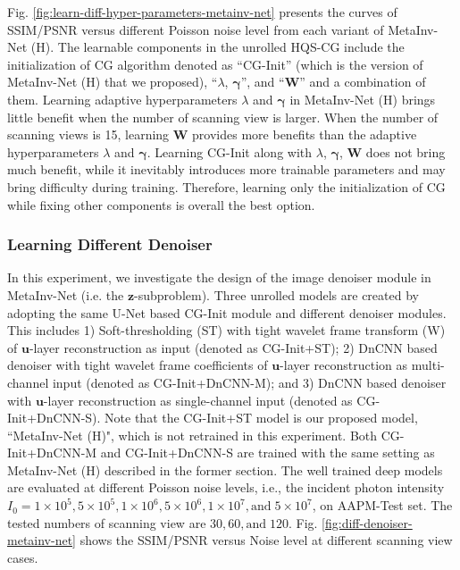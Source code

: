 \documentclass[journal,twoside]{IEEEtran}
\begin{document}
Fig. \ref{fig:learn-diff-hyper-parameters-metainv-net} presents the curves of SSIM/PSNR versus different Poisson noise level from each variant of MetaInv-Net (H). The learnable components in the unrolled HQS-CG include the initialization of CG algorithm denoted as ``CG-Init'' (which is the version of MetaInv-Net (H) that we proposed), ``$\lambda$, $\bm{\gamma}$'', and ``$\bm{W}$'' and a combination of them. Learning adaptive hyperparameters $\lambda$ and $\bm{\gamma}$ in MetaInv-Net (H) brings little benefit when the number of scanning view is larger. When the number of scanning views is 15, learning $\bm{W}$ provides more benefits than the adaptive hyperparameters $\lambda$ and $\bm{\gamma}$. Learning CG-Init along with $\lambda$, $\bm{\gamma}$, $\bm{W}$ does not bring much benefit, while it inevitably introduces more trainable parameters and may bring difficulty during training. Therefore, learning only the initialization of CG while fixing other components is overall the best option.


\subsubsection{Learning Different Denoiser}
In this experiment, we investigate the design of the image denoiser module in MetaInv-Net (i.e. the $\bm{z}$-subproblem). Three unrolled models are created by adopting the same U-Net based CG-Init module and different denoiser modules. This includes 1) Soft-thresholding (ST) with tight wavelet frame transform  (W) of $\bm{u}$-layer reconstruction as input (denoted as CG-Init+ST); 2) DnCNN based denoiser \cite{zhang2017learning} with tight wavelet frame coefficients of $\bm{u}$-layer reconstruction as multi-channel input (denoted as CG-Init+DnCNN-M); and 3) DnCNN based denoiser with $\bm{u}$-layer reconstruction as single-channel input (denoted as CG-Init+DnCNN-S). Note that the CG-Init+ST model is our proposed model, ``MetaInv-Net (H)", which is not retrained in this experiment. Both CG-Init+DnCNN-M and CG-Init+DnCNN-S are trained with the same setting as MetaInv-Net (H) described in the former section. The well trained deep models are evaluated at different Poisson noise levels, i.e., the incident photon intensity $I_{0}=1\times 10^{5}, 5\times 10^{5}, 1 \times 10^{6}, 5 \times 10^{6}, 1 \times 10^{7}, \mbox{and}\; 5\times 10^{7}$, on AAPM-Test set. The tested numbers of scanning view are $30, 60, \mbox{and}\; 120$. Fig. \ref{fig:diff-denoiser-metainv-net} shows the SSIM/PSNR versus Noise level at different scanning view cases.
\end{document}

